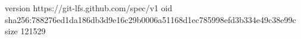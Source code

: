 version https://git-lfs.github.com/spec/v1
oid sha256:788276ed1da186db3d9e16c29b0006a51168d1ec785998efd3b334e49c38e99c
size 121529
